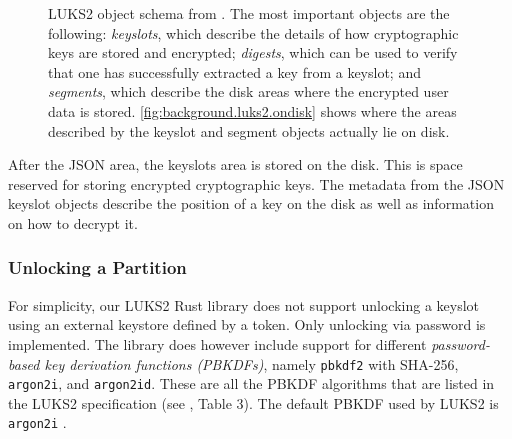 \begin{figure}[htb!]
	\center
	\caption[
		LUKS2 object schema
	]{
		LUKS2 object schema from \cite{Broz2018}. The most important objects are the following: \emph{keyslots}, which describe the details of how cryptographic keys are stored and encrypted; \emph{digests}, which can be used to verify that one has successfully extracted a key from a keyslot; and \emph{segments}, which describe the disk areas where the encrypted user data is stored. \autoref{fig:background.luks2.ondisk} shows where the areas described by the keyslot and segment objects actually lie on disk.
	}
	\label{fig:background.luks2.jsonobjects}
\end{figure}

After the JSON area, the keyslots area is stored on the disk. This is space reserved for storing encrypted cryptographic keys. The metadata from the JSON keyslot objects describe the position of a key on the disk as well as information on how to decrypt it. 

\subsubsection{Unlocking a Partition}
\label{chap:background.luks2.unlocking}
For simplicity, our LUKS2 Rust library does not support unlocking a keyslot using an external keystore defined by a token. Only unlocking via password is implemented. The library does however include support for different \emph{password-based key derivation functions (PBKDFs)}, namely \texttt{pbkdf2} with SHA-256, \texttt{argon2i}, and \texttt{argon2id}. These are all the PBKDF algorithms that are listed in the LUKS2 specification (see \cite{Broz2018}, Table 3). The default PBKDF used by LUKS2 is \texttt{argon2i} \cite{Cryptsetup2020}.

